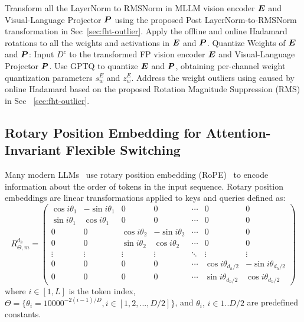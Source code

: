 \begin{algorithm}[!htb]
\begin{algorithmic}[1]
\begin{enumerate}[label=(\alph*)]
\end{enumerate}
\STATE Transform all the LayerNorm to RMSNorm in MLLM vision encoder $\boldsymbol{E}$ and Visual-Language Projector $\boldsymbol{P}$ using the proposed Post LayerNorm-to-RMSNorm transformation in Sec~\ref{sec:fht-outlier}.
\STATE Apply the offline and online Hadamard rotations to all the weights and activations in $\boldsymbol{E}$ and $\boldsymbol{P}$.
\STATE Quantize Weights of $\boldsymbol{E}$ and $\boldsymbol{P}$:
\STATE Input $D^c$ to the transformed FP vision encoder $\boldsymbol{E}$ and Visual-Language Projector $\boldsymbol{P}$.
\STATE Use GPTQ to quantize $\boldsymbol{E}$ and $\boldsymbol{P}$, obtaining per-channel weight quantization parameters $s^E_{w}$ and $z^E_{w}$.
\STATE Address the weight outliers using caused by online Hadamard based on the proposed Rotation Magnitude Suppression (RMS) in Sec ~\ref{sec:fht-outlier}.
\end{algorithmic}
\end{algorithm}

\subsection{Rotary Position Embedding for Attention-Invariant Flexible Switching}
\label{rope}
Many modern LLMs~\citep{touvron2023llama,llama2,llama3} use rotary position embedding (RoPE)~\citep{su2021roformer} to encode information about the order of tokens in the input sequence. Rotary position embeddings are linear transformations applied to keys and queries defined as: 
\vspace{-2mm}
\begin{equation}
R_{\Theta,m}^{d_h} =
	\begin{pmatrix}
		\cos{i\theta_1}& -\sin{i\theta_1}& 0 &0 &\cdots & 0 &0\\
		\sin{i\theta_1}&\cos{i\theta_1} &0 &0  &\cdots & 0 &0 \\
            0 &0 &\cos{i\theta_2}& -\sin{i\theta_2} &\cdots & 0 &0\\
		0 & 0 &\sin{i\theta_2}&\cos{i\theta_2}   &\cdots & 0 &0 \\
		\vdots &\vdots &\vdots &\vdots &\ddots &\vdots &\vdots\\
    		0 & 0 &0 &0 &\cdots&\cos{i\theta_{d_h/2}}& -\sin{i\theta_{d_h/2}}\\
		0 & 0 &0 &0 &\cdots&\sin{i\theta_{d_h/2}}&\cos{i\theta_{d_h/2}}
	\end{pmatrix}
    \label{algo:rope}
\end{equation}
where $i \in [1, L]$ is the token index, $\Theta = \{\theta_i=10000^{-2(i-1)/D}, i \in [1, 2, ..., D/2]\}$, and $\theta_i,\, i \in 1..D/2$ are predefined constants.

